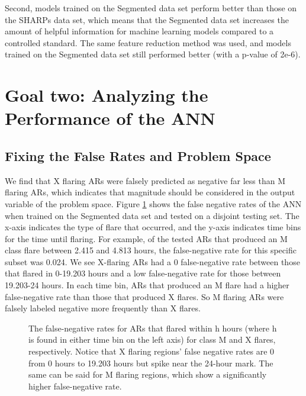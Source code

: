 Second, models trained on the Segmented data set perform better than those on the SHARPs data set, which means that the Segmented data set increases the amount of helpful information for machine learning models compared to a controlled standard. The same feature reduction method was used, and models trained on the Segmented data set still performed better (with a p-value of 2e-6).  

\section{Goal two: Analyzing the Performance of the ANN}

\subsection{Fixing the False Rates and Problem Space}
We find that X flaring ARs were falsely predicted as negative far less than M flaring ARs, which indicates that magnitude should be considered in the output variable of the problem space. Figure \ref{fig:segfnr} shows the false negative rates of the ANN when trained on the Segmented data set and tested on a disjoint testing set. The x-axis indicates the type of flare that occurred, and the y-axis indicates time bins for the time until flaring. For example, of the tested ARs that produced an M class flare between 2.415 and 4.813 hours, the false-negative rate for this specific subset was 0.024. We see X-flaring ARs had a 0 false-negative rate between those that flared in 0-19.203 hours and a low false-negative rate for those between 19.203-24 hours. In each time bin, ARs that produced an M flare had a higher false-negative rate than those that produced X flares. So M flaring ARs were falsely labeled negative more frequently than X flares.
\begin{figure}[h]
    \centering
    \caption{The false-negative rates for ARs that flared within h hours (where h is found in either time bin on the left axis) for class M and X flares, respectively. Notice that X flaring regions' false negative rates are 0 from 0 hours to 19.203 hours but spike near the 24-hour mark. The same can be said for M flaring regions, which show a significantly higher false-negative rate.}
    \label{fig:segfnr}
\end{figure}

